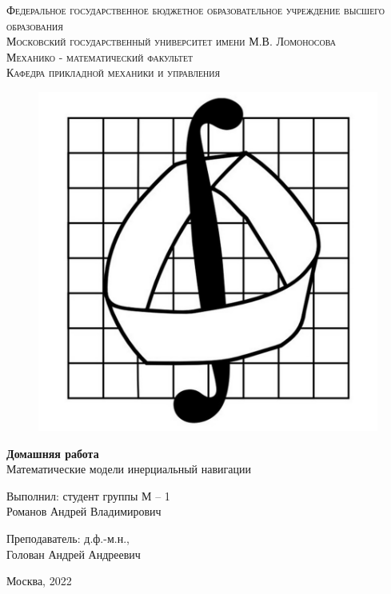 \documentclass[a4paper,14pt]{article}
\theoremstyle{plain} %
\theoremstyle{definition} %
\theoremstyle{remark} %
\begin{document}
\begin{center}
    {\textsc{Федеральное государственное бюджетное образовательное
            учреждение высшего образования
        }}\\
    {\textsc{Московский государственный университет имени М.В. Ломоносова
    }} \\
    \vspace{0.2cm}
    {\textsc{Механико - математический факультет}}\\
    \vspace{0.2cm}
    {\textsc{Кафедра прикладной механики и управления}}\\
    \hfill \break
    \begin{figure}[h!]
        \centering
        \includegraphics[width=0.30\linewidth]{emblema}
        \label{fig:emblema}
    \end{figure}
    \hfill \break
    \hfill \break
    \large{\textbf{Домашняя работа}\\
        \hfill \break Математические модели инерциальный навигации
    }
\end{center}

\hfill \break
\hfill \break
\begin{flushright}
    {
        Выполнил: студент группы М -- 1 \\ Романов Андрей Владимирович}
\end{flushright}

\begin{flushright}
    {
        Преподаватель: д.ф.-м.н., \\ Голован Андрей Андреевич}
\end{flushright}
\hfill \break
\hfill \break
\begin{center} {Москва, 2022} \end{center}
\end{document}

